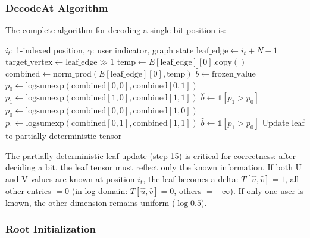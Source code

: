 \documentclass[11pt,a4paper]{article}
\begin{document}
\subsubsection{DecodeAt Algorithm}

The complete algorithm for decoding a single bit position is:

\begin{algorithm}[h]
\caption{DecodeAt for position $i_t$ at path step $\gamma$ (0=U, 1=V)}
\begin{algorithmic}[1]
\Require $i_t$: 1-indexed position, $\gamma$: user indicator, graph state
\State $\text{leaf\_edge} \gets i_t + N - 1$
\State $\text{target\_vertex} \gets \text{leaf\_edge} \gg 1$
\State {} 
\State $\text{temp} \gets E[\text{leaf\_edge}][0].\text{copy}()$ 
  \State {} 
\Else
  \State {}
\EndIf
\State $\text{combined} \gets \text{norm\_prod}(E[\text{leaf\_edge}][0], \text{temp})$
  \State $\hat{b} \gets \text{frozen\_value}$
 
  \State $p_0 \gets \text{logsumexp}(\text{combined}[0,0], \text{combined}[0,1])$
  \State $p_1 \gets \text{logsumexp}(\text{combined}[1,0], \text{combined}[1,1])$
  \State $\hat{b} \gets \mathbb{1}[p_1 > p_0]$ 
\Else {}
  \State $p_0 \gets \text{logsumexp}(\text{combined}[0,0], \text{combined}[1,0])$
  \State $p_1 \gets \text{logsumexp}(\text{combined}[0,1], \text{combined}[1,1])$
  \State $\hat{b} \gets \mathbb{1}[p_1 > p_0]$ 
\EndIf
\State Update leaf to partially deterministic tensor 
\end{algorithmic}
\end{algorithm}

The partially deterministic leaf update (step 15) is critical for correctness:
after deciding a bit, the leaf tensor must reflect only the known information.
If both U and V values are known at position $i_t$, the leaf becomes a delta:
$T[\hat{u}, \hat{v}] = 1$, all other entries $= 0$ (in log-domain:
$T[\hat{u}, \hat{v}] = 0$, others $= -\infty$). If only one user is known,
the other dimension remains uniform ($\log 0.5$).

\subsubsection{Root Initialization}
\end{document}

